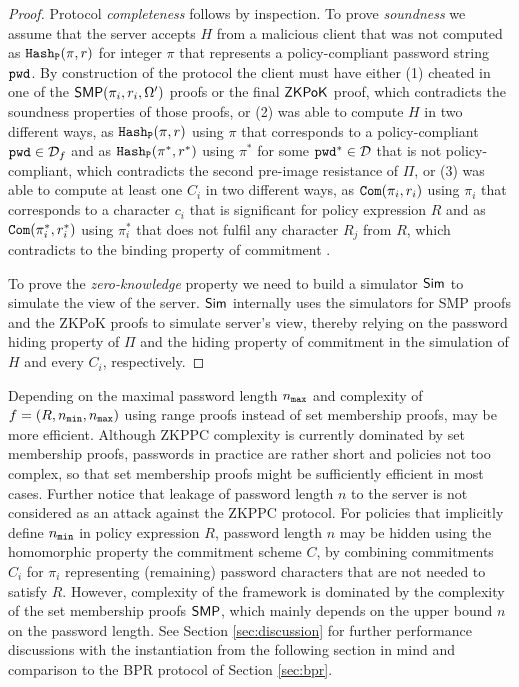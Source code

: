 \begin{proof}
Protocol \emph{completeness} follows by inspection.
To prove \emph{soundness} we assume that the server accepts $H$ from a malicious client that was not computed as $\mathtt{Hash_P}(\pi,r)$ for integer $\pi$ that represents a policy-compliant password string $\mathtt{pwd}$. 
By construction of the protocol the client must have either 
(1) cheated in one of the $\mathsf{SMP}(\pi_i,r_i,\Omega')$ proofs or the final $\mathsf{ZKPoK}$ proof, which contradicts the soundness properties of those proofs, or 
(2) was able to compute $H$ in two different ways, as $\mathtt{Hash_P}(\pi,r)$ using $\pi$ that corresponds to a policy-compliant $\mathtt{pwd}\in\mathcal{D}_f$ and as $\mathtt{Hash_P}(\pi^\ast,r^\ast)$ using $\pi^\ast$ for some $\mathtt{pwd}^\ast\in\mathcal{D}$ that is not policy-compliant, which contradicts the second pre-image resistance of $\Pi$, or 
(3) was able to compute at least one $C_i$ in two different ways, as $\mathtt{Com}(\pi_i, r_i)$ using $\pi_i$  that corresponds to a character $c_i$ that is significant for policy expression $R$ and as $\mathtt{Com}(\pi^\ast_i, r^\ast_i)$ using $\pi^\ast_i$ that does not fulfil any character $R_j$ from $R$, which contradicts to the binding property of commitment \Commitment.

To prove the \emph{zero-knowledge} property we need to build a simulator $\mathsf{Sim}$ to simulate the view of the server. 
$\mathsf{Sim}$ internally uses the simulators for \ac{SMP} proofs and the \ac{ZKPoK} proofs to simulate server's view, thereby relying on the password hiding property of $\Pi$ and the hiding property of commitment \Commitment in the simulation of $H$ and every $C_i$, respectively.
\end{proof}

\begin{remark}\label{rangeproofs}
Depending on the maximal password length ${n_\mathtt{max}}$ and complexity of $f=(R,{n_\mathtt{min}},{n_\mathtt{max}})$ using range proofs instead of set membership proofs, may be more efficient.
Although \ac{ZKPPC} complexity is currently dominated by set membership proofs, passwords in practice are rather short and policies not too complex, so that set membership proofs might be sufficiently efficient in most cases.
Further notice that leakage of password length $n$ to the server is not considered as an attack against the \ac{ZKPPC} protocol. 
For policies that implicitly define ${n_\mathtt{min}}$ in policy expression $R$, password length $n$ may be hidden using the homomorphic property the commitment scheme $C$, \ie by combining commitments $C_i$ for $\pi_i$ representing (remaining) password characters that are not needed to satisfy $R$.
However, complexity of the framework is dominated by the complexity of the set membership proofs $\mathsf{SMP}$, which mainly depends on the upper bound $n$ on the password length.
See Section \ref{sec:discussion} for further performance discussions with the instantiation from the following section in mind and comparison to the \ac{BPR} protocol of Section \ref{sec:bpr}.
\end{remark}

